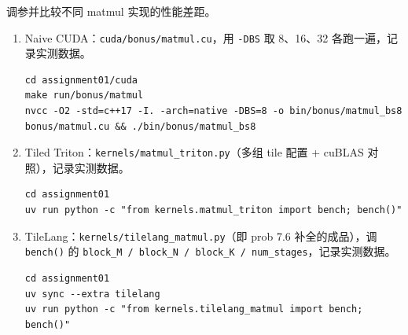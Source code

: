 \documentclass[11pt,a4paper,fontset=none]{ctexart}
\begin{document}
调参并比较不同 matmul 实现的性能差距。

\begin{enumerate}[label=(\alph*)]
  \item Naive CUDA：\texttt{cuda/bonus/matmul.cu}，用 \texttt{-DBS} 取 8、16、32 各跑一遍，记录实测数据。
\begin{lstlisting}
cd assignment01/cuda
make run/bonus/matmul
nvcc -O2 -std=c++17 -I. -arch=native -DBS=8 -o bin/bonus/matmul_bs8 bonus/matmul.cu && ./bin/bonus/matmul_bs8
\end{lstlisting}




  \item Tiled Triton：\texttt{kernels/matmul\_triton.py}（多组 tile 配置 + cuBLAS 对照），记录实测数据。
\begin{lstlisting}
cd assignment01
uv run python -c "from kernels.matmul_triton import bench; bench()"
\end{lstlisting}


  \item TileLang：\texttt{kernels/tilelang\_matmul.py}（即 prob 7.6 补全的成品），调 \texttt{bench()} 的 \texttt{block\_M / block\_N / block\_K / num\_stages}，记录实测数据。
\begin{lstlisting}
cd assignment01
uv sync --extra tilelang
uv run python -c "from kernels.tilelang_matmul import bench; bench()"
\end{lstlisting}


\end{enumerate}
\end{document}
